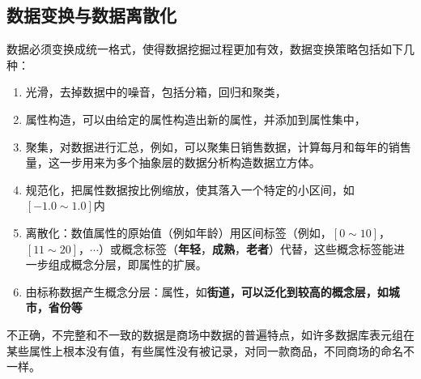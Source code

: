 \subsection{数据变换与数据离散化}
\par 数据必须变换成统一格式，使得数据挖掘过程更加有效，数据变换策略包括如下几种：
\begin{enumerate}[(1)]
\item 光滑，去掉数据中的噪音，包括分箱，回归和聚类，
\item 属性构造，可以由给定的属性构造出新的属性，并添加到属性集中，
\item 聚集，对数据进行汇总，例如，可以聚集日销售数据，计算每月和每年的销售量，这一步用来为多个抽象层的数据分析构造数据立方体。
\item 规范化，把属性数据按比例缩放，使其落入一个特定的小区间，如$[-1.0 \sim 1.0]$内
\item 离散化：数值属性的原始值（例如年龄）用区间标签（例如，$[0 \sim 10]$，$[11 \sim 20]$，$\cdots$）或概念标签（\textbf{年轻}，\textbf{成熟}，\textbf{老者}）代替，这些概念标签能进一步组成概念分层，即属性的扩展。
\item 由标称数据产生概念分层：属性，如\bfseries{街道}，可以泛化到较高的概念层，如\textbf{城市}，\textbf{省份}等
\end{enumerate}
\par 不正确，不完整和不一致的数据是商场中数据的普遍特点，如许多数据库表元组在某些属性上根本没有值，有些属性没有被记录，对同一款商品，不同商场的命名不一样。